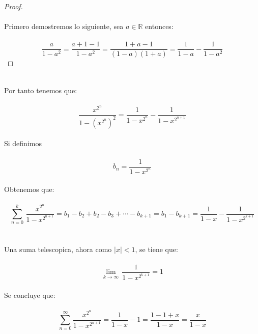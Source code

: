 \documentclass[11pt,letterpaper]{article}
\newcommand{\R}{\mathbb{R}}
\begin{document}
\begin{proof}\,\\
    \,\\
    Primero demostremos lo siguiente, sea $a\in \R$ entonces:\,\\
    \,\\
    \begin{equation*}
        \frac{a}{1-a^2}=\frac{a+1-1}{1-a^2}=\frac{1+a-1}{(1-a)(1+a)}=\frac{1}{1-a}-\frac{1}{1-a^2}
    \end{equation*}
    
\end{proof}\,\\
Por tanto tenemos que:\,\\
\,\\
\begin{equation*}
    \frac{x^{2^{n}}}{1-(x^{2^{n}})^2}=\frac{1}{1-x^{2^n}}-\frac{1}{1-x^{2^{n+1}}}
\end{equation*}\,\\
Si definimos\,\\
\,\\
\begin{equation*}
    b_n=\frac{1}{1-x^{2^n}}
\end{equation*}\,\\
Obtenemos que:\,\\
\,\\
\begin{equation*}
    \sum_{n=0}^k\,\frac{x^{2^n}}{1-x^{2^{n+1}}}=b_1-b_2+b_2-b_3+\cdots-b_{k+1}=b_1-b_{k+1}=\frac{1}{1-x}-\frac{1}{1-x^{2^{k+1}}}
\end{equation*}\,\\
\,\\
Una suma telescopica, ahora como $|x|<1$, se tiene que:\,\\
\,\\
\begin{equation*}
    \lim_{k\rightarrow \infty}\,\frac{1}{1-x^{2^{k+1}}}=1
\end{equation*}\,\\
Se concluye que:\,\\
\,\\
\begin{equation*}
    \sum_{n=0}^{\infty}\frac{x^{2^n}}{1-x^{2^{n+1}}}=\frac{1}{1-x}-1=\frac{1-1+x}{1-x}=\frac{x}{1-x}
\end{equation*}
\end{document}
